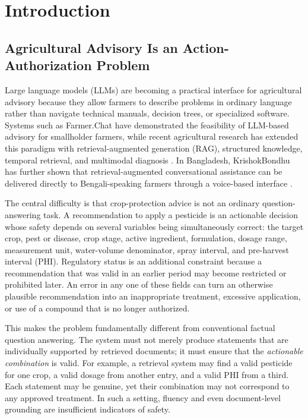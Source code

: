 \documentclass[a4paper,fleqn]{cas-dc}
\begin{document}
\section{Introduction}
\label{sec:introduction}

\subsection{Agricultural Advisory Is an Action-Authorization Problem}
Large language models (LLMs) are becoming a practical interface for agricultural advisory because they allow farmers to describe problems in ordinary language rather than navigate technical manuals, decision trees, or specialized software. Systems such as Farmer.Chat have demonstrated the feasibility of LLM-based advisory for smallholder farmers, while recent agricultural research has extended this paradigm with retrieval-augmented generation (RAG), structured knowledge, temporal retrieval, and multimodal diagnosis \citep{farmerchat2024,goatrag2026,tarag2026,smart2026}. In Bangladesh, KrishokBondhu has further shown that retrieval-augmented conversational assistance can be delivered directly to Bengali-speaking farmers through a voice-based interface \citep{krishokbondhu2025}.

The central difficulty is that crop-protection advice is not an ordinary question-answering task. A recommendation to apply a pesticide is an actionable decision whose safety depends on several variables being simultaneously correct: the target crop, pest or disease, crop stage, active ingredient, formulation, dosage range, measurement unit, water-volume denominator, spray interval, and pre-harvest interval (PHI). Regulatory status is an additional constraint because a recommendation that was valid in an earlier period may become restricted or prohibited later. An error in any one of these fields can turn an otherwise plausible recommendation into an inappropriate treatment, excessive application, or use of a compound that is no longer authorized.

This makes the problem fundamentally different from conventional factual question answering. The system must not merely produce statements that are individually supported by retrieved documents; it must ensure that the \emph{actionable combination} is valid. For example, a retrieval system may find a valid pesticide for one crop, a valid dosage from another entry, and a valid PHI from a third. Each statement may be genuine, yet their combination may not correspond to any approved treatment. In such a setting, fluency and even document-level grounding are insufficient indicators of safety.
\end{document}
